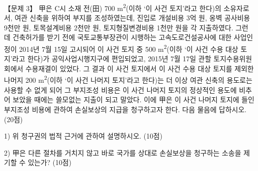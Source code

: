 \begin{longquestion}{【문제 3】}
甲은 C시 소재 전(田) 700 m\textsuperscript{2}(이하 ‘이 사건 토지’라고 한다)의 소유자로서, 여관 신축을 위하여 부지를 조성하였는데, 진입로 개설비용 3억 원, 옹벽 공사비용 9천만 원, 토목설계비용 2천만 원, 토지형질변경비용 1천만 원을 각 지출하였다. 그런데 건축허가를 받기 전에 국토교통부장관이 시행하는 고속도로건설공사에 대한 사업인정이 2014년 7월 15일 고시되어 이 사건 토지 중 500 m\textsuperscript{2}(이하 ‘이 사건 수용 대상 토지’라고 한다)가 공익사업시행지구에 편입되었고, 2015년 7월 17일 관할 토지수용위원회에서 수용재결이 있었다. 그 결과 이 사건 토지에서 이 사건 수용 대상 토지를 제외한 나머지 200 m\textsuperscript{2}(이하 ‘이 사건 나머지 토지’라고 한다)는 더 이상 여관 신축의 용도로는 사용할 수 없게 되어 그 부지조성 비용은 이 사건 나머지 토지의 정상적인 용도에 비추어 보았을 때에는 쓸모없는 지출이 되고 말았다. 이에 甲은 이 사건 나머지 토지에 들인 부지조성 비용에 관하여 손실보상의 지급을 청구하고자 한다. 다음 물음에 답하시오. (20점) \par
1) 위 청구권의 법적 근거에 관하여 설명하시오. (10점) \par
2) 甲은 다른 절차를 거치지 않고 바로 국가를 상대로 손실보상을 청구하는 소송을 제기할 수 있는가? (10점) \par
\end{longquestion}
